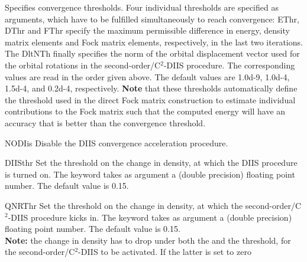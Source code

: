 \begin{keywordlist}
Specifies convergence thresholds. Four individual thresholds are specified
as arguments, which have to be fulfilled simultaneously to reach convergence:
EThr, DThr and FThr
specify the maximum permissible difference in energy, density matrix elements
and Fock matrix elements, respectively, in the last two iterations. The
DltNTh finally specifies the norm of the orbital displacement vector used
for the orbital rotations in the second-order/C$^2$-DIIS procedure.
The corresponding values are read in the order given above.
The default values are 1.0d-{}9, 1.0d-{}4, 1.5d-{}4, and 0.2d-{}4,
respectively.
{\bf Note} that these thresholds automatically define the threshold
used in the direct Fock matrix construction to estimate individual
contributions to the Fock matrix such that
the computed energy will have an accuracy that is better than the
convergence threshold.
\item[NODIis]
Disable the DIIS convergence acceleration procedure.
\item[DIISthr]
Set the threshold on the change in density, at which the DIIS procedure
is turned on.
The keyword takes as argument a (double precision) floating point number.
The default value is 0.15.
\item[QNRThr]
Set the threshold on the change in density, at which the
second-order/C$^2$-DIIS
procedure kicks in.
The keyword takes as argument a (double precision) floating point number.
The default value is 0.15. \\
{\bf Note:} the change in density has to drop under both the
 and the  threshold, for the
second-order/C$^2$-DIIS to be activated. If the latter is set to zero

\end{keywordlist}
